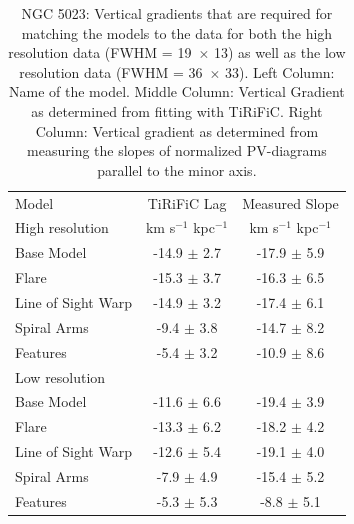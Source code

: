 \documentclass[useAMS,usenatbib]{mn2e}
\begin{document}
 \begin{table}
    \centering
    \begin{tabular}{@{} lcc @{}} %
       \hline
       \hline
       Model & {\sc TiRiFiC} Lag  & Measured Slope\\
       High resolution   	&km s$^{-1}$ kpc$^{-1}$& km s$^{-1}$ kpc$^{-1}$\\
       \hline
Base Model& -14.9 $\pm$ 2.7     & -17.9 $\pm$   5.9\\
 Flare& -15.3 $\pm$ 3.7       & -16.3 $\pm$  6.5\\
 Line of Sight Warp&-14.9 $\pm$ 3.2     & -17.4 $\pm$   6.1\\
 Spiral Arms& -9.4 $\pm$  3.8      & -14.7  $\pm$   8.2\\ 
 Features     & -5.4 $\pm$ 3.2& -10.9 $\pm$  8.6\\
           \hline
        Low resolution & &\\
           \hline
           Base Model&  -11.6 $\pm$ 6.6    & -19.4 $\pm$   3.9\\
 Flare& -13.3 $\pm$ 6.2    & -18.2 $\pm$   4.2\\
 Line of Sight Warp&-12.6 $\pm$ 5.4 & -19.1 $\pm$   4.0\\
 Spiral Arms&  -7.9 $\pm$  4.9 & -15.4  $\pm$   5.2\\
 Features     &  -5.3 $\pm$  5.3 & -8.8 $\pm$   5.1\\
\hline
    \end{tabular}
    \caption{NGC 5023: Vertical gradients that are required for matching the models to the data for both the high resolution data (FWHM = 19\arcsec\ $\times$ 13\arcsec) as well as the low resolution data (FWHM = 36\arcsec\ $\times$ 33\arcsec). Left Column: Name of the model. Middle Column: Vertical Gradient as determined from fitting with {\sc TiRiFiC}. Right Column: Vertical gradient as determined from measuring the slopes of normalized PV-diagrams parallel to the minor axis. }
    \label{tab:lag}
 \end{table}
\end{document}
